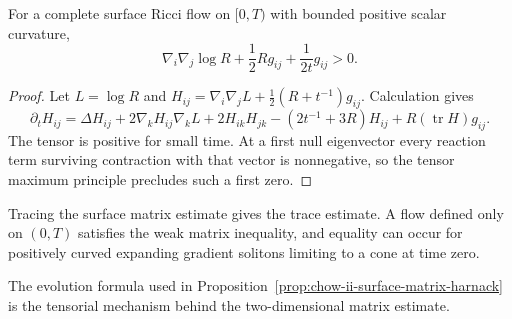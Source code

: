 \begin{proposition}
\label{prop:chow-ii-surface-matrix-harnack}
For a complete surface Ricci flow on \([0,T)\) with bounded positive scalar
curvature,
\[
\nabla_i\nabla_j\log R+\frac12Rg_{ij}+\frac1{2t}g_{ij}>0.
\]
\end{proposition}
\begin{proof}
\sketch Let \(L=\log R\) and
\(H_{ij}=\nabla_i\nabla_jL+\tfrac12(R+t^{-1})g_{ij}\).  Calculation gives
\[
\partial_tH_{ij}=\Delta H_{ij}+2\nabla_kH_{ij}\nabla_kL
+2H_{ik}H_{jk}-(2t^{-1}+3R)H_{ij}+R(\operatorname{tr}H)g_{ij}.
\]
The tensor is positive for small time.  At a first null eigenvector every
reaction term surviving contraction with that vector is nonnegative, so the
tensor maximum principle precludes such a first zero.
\end{proof}

\begin{remark}
\label{rem:chow-ii-surface-matrix-harnack-consequences}
Tracing the surface matrix estimate gives the trace estimate.  A flow defined
only on \((0,T)\) satisfies the weak matrix inequality, and equality can occur
for positively curved expanding gradient solitons limiting to a cone at time
zero.
\end{remark}

\begin{remark}
\label{rem:chow-ii-surface-matrix-evolution-reference}
The evolution formula used in Proposition~\ref{prop:chow-ii-surface-matrix-harnack}
is the tensorial mechanism behind the two-dimensional matrix estimate.
\end{remark}

